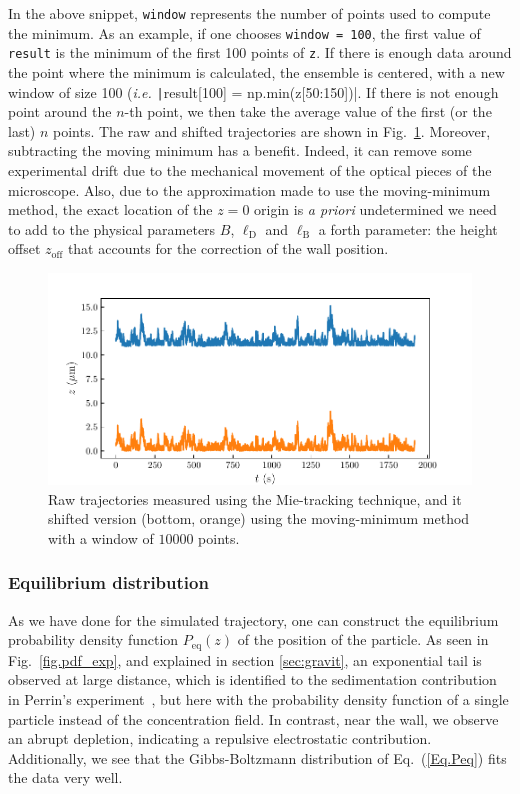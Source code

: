 In the above snippet, \texttt{window} represents the number of points used to compute the minimum. As an example, if one chooses \texttt{window = 100}, the first value of \texttt{result} is the minimum of the first 100 points of \texttt{z}. If there is enough data around the point where the minimum is calculated, the ensemble is centered, with a new window of size 100 (\textit{i.e.} \texttt|result[100] = np.min(z[50:150])|. If there is not enough point around the $n$-th point, we then take the average value of the first (or the last) $n$ points. The raw and shifted trajectories are shown  in Fig.~\ref{fig.rescaled_traj}. Moreover, subtracting the moving minimum has a benefit. Indeed, it can remove some experimental drift due to the mechanical movement of the optical pieces of the microscope. Also, due to the approximation made to use the moving-minimum method, the exact location of the $z=0$ origin is \textit{a priori} undetermined we need to add to the physical parameters $B$, $\ell_\mathrm{D}$ and $\ell_\mathrm{B}$ a forth parameter: the height offset $z_\mathrm{off}$ that accounts for the correction of the wall position.

\begin{figure}[ht]
	\centering
	\includegraphics{02_body/chapter3/images/trajctory_analysis/traj_rescaled.pdf}
	\caption{Raw trajectories measured using the Mie-tracking technique, and it shifted version (bottom, orange) using the moving-minimum method with a window of $10000$ points.} 
	\label{fig.rescaled_traj}
\end{figure}

\subsubsection{Equilibrium distribution}

As we have done for the simulated trajectory, one can construct the equilibrium probability density function $P_\mathrm{eq}(z)$ of the position of the particle. As seen in Fig.~\ref{fig.pdf_exp}, and explained in section \ref{sec:gravit}, an exponential tail is observed at large distance, which is identified to the sedimentation contribution in Perrin's experiment~\cite{perrin_les_2014}, but here with the probability density function of a single particle instead of the concentration field. In contrast, near the wall, we observe an abrupt depletion, indicating a repulsive electrostatic contribution. Additionally, we see that the Gibbs-Boltzmann distribution of Eq.~(\ref{Eq.Peq}) fits the data very well.



